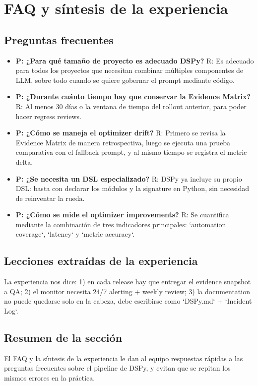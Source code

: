 \section{FAQ y síntesis de la experiencia}

\subsection{Preguntas frecuentes}

\begin{itemize}
    \item \textbf{P: ¿Para qué tamaño de proyecto es adecuado DSPy?} R: Es adecuado para todos los proyectos que necesitan combinar múltiples componentes de LLM, sobre todo cuando se quiere gobernar el prompt mediante código.
    \item \textbf{P: ¿Durante cuánto tiempo hay que conservar la Evidence Matrix?} R: Al menos 30 días o la ventana de tiempo del rollout anterior, para poder hacer regress reviews.
    \item \textbf{P: ¿Cómo se maneja el optimizer drift?} R: Primero se revisa la Evidence Matrix de manera retrospectiva, luego se ejecuta una prueba comparativa con el fallback prompt, y al mismo tiempo se registra el metric delta.
    \item \textbf{P: ¿Se necesita un DSL especializado?} R: DSPy ya incluye su propio DSL: basta con declarar los módulos y la signature en Python, sin necesidad de reinventar la rueda.
    \item \textbf{P: ¿Cómo se mide el optimizer improvements?} R: Se cuantifica mediante la combinación de tres indicadores principales: `automation coverage`, `latency` y `metric accuracy`.
\end{itemize}

\subsection{Lecciones extraídas de la experiencia}

La experiencia nos dice: 1) en cada release hay que entregar el evidence snapshot a QA; 2) el monitor necesita 24/7 alerting + weekly review; 3) la documentation no puede quedarse solo en la cabeza, debe escribirse como `DSPy.md` + `Incident Log`.

\subsection{Resumen de la sección}

El FAQ y la síntesis de la experiencia le dan al equipo respuestas rápidas a las preguntas frecuentes sobre el pipeline de DSPy, y evitan que se repitan los mismos errores en la práctica.

